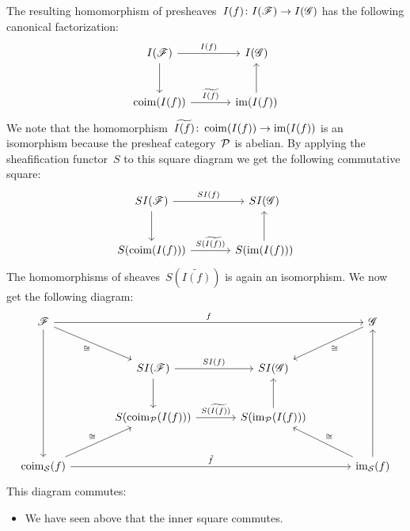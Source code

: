 \begin{example}
\begin{enumerate}[resume]
      The resulting homomorphism of presheaves~$I(f) \colon I(\mathscr{F}) \to I(\mathscr{G})$ has the following canonical factorization:
      \[
        \begin{tikzcd}[sep = large]
            I(\Fs)
            \arrow{r}[above]{I(f)}
            \arrow{d}
          & I(\Gs)
          \\
            \coim(I(f))
            \arrow{r}[above]{\widetilde{I(f)}}
          & \im(I(f))
            \arrow{u}
        \end{tikzcd}
      \]
      We note that the homomorphism~$\widetilde{I(f)} \colon \operatorname{coim}(I(f)) \to \operatorname{im}(I(f))$ is an isomorphism because the presheaf category~$\mathcal{P}$ is abelian.
      By applying the sheafification functor~$S$ to this square diagram we get the following commutative square:
      \[
        \begin{tikzcd}[sep = large]
            SI(\Fs)
            \arrow{r}[above]{SI(f)}
            \arrow{d}
          & SI(\Gs)
          \\
            S(\coim(I(f)))
            \arrow{r}[above]{S(\widetilde{I(f)})}
          & S(\im(I(f)))
            \arrow{u}
        \end{tikzcd}
      \]
      The homomorphisms of sheaves~$S(\widetilde{I(f)})$ is again an isomorphism.      
      We now get the following diagram:
      \[
        \begin{tikzcd}[sep = large]
            \Fs
            \arrow{rrr}[above]{f}
            \arrow{dr}[below left]{\cong}
            \arrow{ddd}
          & {}
          & {}
          & \Gs
            \arrow{dl}[below right]{\cong}
          \\
            {}
          & SI(\Fs)
            \arrow{r}[above]{SI(f)}
            \arrow{d}
          & SI(\Gs)
          & {}
          \\
            {}
          & S( \coim_\Pcat(I(f)) )
            \arrow{r}[above]{S(\widetilde{I(f)})}
          & S( \im_\Pcat(I(f)) )
            \arrow{u}
          & {}
          \\
            \coim_\Scat(f)
            \arrow{ur}[above left]{\cong}
            \arrow{rrr}[above]{\tilde{f}}
          & {}
          & {}
          & \im_\Scat(f)
            \arrow{ul}[above right]{\cong}
            \arrow{uuu}
        \end{tikzcd}
      \]
      This diagram commutes:
      \begin{itemize}
        \item
          We have seen above that the inner square commutes.

\end{itemize}
\end{enumerate}
\end{example}
